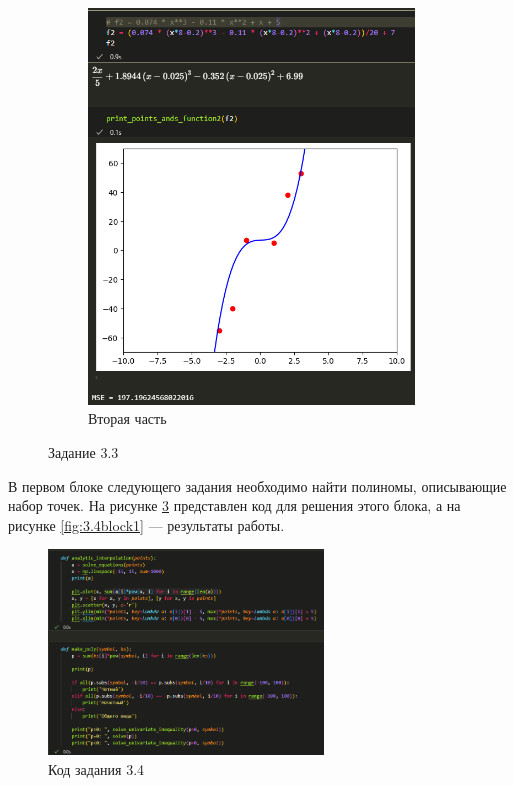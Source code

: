\documentclass[14pt,a4paper]{extarticle}
\begin{document}
\begin{figure}[h!]
\begin{subfigure}{.5\textwidth}
        \includegraphics[width=0.95\textwidth]{figures/3.3-2.png}
        \caption{Вторая часть}
        \label{fig:3.3.2}
    \end{subfigure}
    \caption{Задание 3.3}
    \label{fig:3.3}
\end{figure}

        В первом блоке следующего задания необходимо найти полиномы,
описывающие набор точек. На рисунке \ref{fig:3.4code} представлен код
для решения этого блока, а на рисунке \ref{fig:3.4block1} --- результаты
работы.

\begin{figure}[h!]
    \centering
    \includegraphics[width=0.65\textwidth]{figures/3.4 code.png}
    \caption{Код задания 3.4}
    \label{fig:3.4code}
\end{figure}
\end{document}
